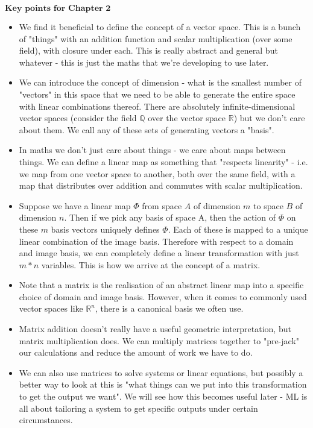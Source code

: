 \documentclass{article}
\begin{document}
	$\textbf{Key points for Chapter 2}$
	\begin{itemize}
		
		\item We find it beneficial to define the concept of a vector space. This is a bunch of "things" with an addition function and scalar multiplication (over some field), with closure under each. This is really abstract and general but whatever - this is just the maths that we're developing to use later.
		
		\item We can introduce the concept of dimension - what is the smallest number of "vectors" in this space that we need to be able to generate the entire space with linear combinations thereof. There are absolutely infinite-dimensional vector spaces (consider the field $\mathbb{Q}$ over the vector space $\mathbb{R}$) but we don't care about them. We call any of these sets of generating vectors a "basis".
		
		\item In maths we don't just care about things - we care about maps between things. We can define a linear map as something that "respects linearity" - i.e. we map from one vector space to another, both over the same field, with a map that distributes over addition and commutes with scalar multiplication.
		
		\item Suppose we have a linear map $\Phi$ from space $A$ of dimension $m$ to space $B$ of dimension $n$. Then if we pick any basis of space A, then the action of $\Phi$ on these $m$ basis vectors uniquely defines $\Phi$. Each of these is mapped to a unique linear combination of the image basis. Therefore with respect to a domain and image basis, we can completely define a linear transformation with just $m*n$ variables. This is how we arrive at the concept of a matrix.
		
		\item Note that a matrix is the realisation of an abstract linear map into a specific choice of domain and image basis. However, when it comes to commonly used vector spaces like $\mathbb{R}^n$, there is a canonical basis we often use.
		
		\item Matrix addition doesn't really have a useful geometric interpretation, but matrix multiplication does. We can multiply matrices together to "pre-jack" our calculations and reduce the amount of work we have to do.
		
		\item We can also use matrices to solve systems or linear equations, but possibly a better way to look at this is "what things can we put into this transformation to get the output we want". We will see how this becomes useful later - ML is all about tailoring a system to get specific outputs under certain circumstances.
		

\end{itemize}
\end{document}

